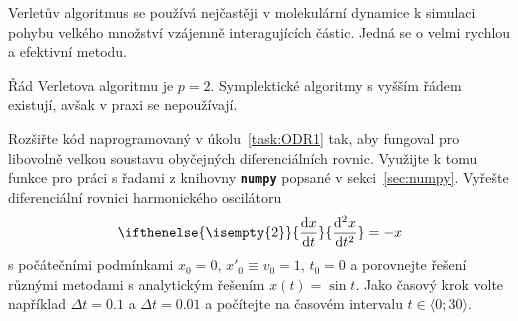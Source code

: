 \documentclass[a4paper,11pt,twoside]{article}
\renewcommand{\d}{\mathrm{d}}           %
\newcommand{\derivative}[3][]{\ifthenelse{\isempty{#1}}	    %
	{\frac{\d{#2}}{\d{#3}}}
	{\frac{\d^{#1}{#2}}{\d{#3}^{#1}}}
}
\def\file#1{\textnormal{\textbf{\texttt{#1}}}}
\theoremstyle{red}
\theoremstyle{green}
\begin{document}
    Verletův algoritmus se používá nejčastěji v molekulární dynamice k simulaci pohybu velkého množství vzájemně interagujících částic.
    Jedná se o velmi rychlou a efektivní metodu.

    Řád Verletova algoritmu je $p=2$. 
    Symplektické algoritmy s vyšším řádem existují, avšak v praxi se nepoužívají.

\begin{solved}
    Rozšiřte kód naprogramovaný v úkolu~\ref{task:ODR1} tak, aby fungoval pro libovolně velkou soustavu obyčejných diferenciálních rovnic.
    Využijte k tomu funkce pro práci s řadami z knihovny \file{numpy} popsané v sekci~\ref{sec:numpy}.
    Vyřešte diferenciální rovnici harmonického oscilátoru 
    \begin{equation}\label{eq:HO}
        \derivative[2]{x}{t}=-x
    \end{equation}
    s počátečními podmínkami $x_{0}=0$, $x'_{0}\equiv v_{0}=1$, $t_{0}=0$ a porovnejte řešení různými metodami s analytickým řešením $x(t)=\sin t$.
    Jako časový krok volte například $\Delta t=0.1$ a $\Delta t=0.01$ a počítejte na časovém intervalu $t\in\langle 0;30\rangle$.
\end{solved}    
\end{document}
